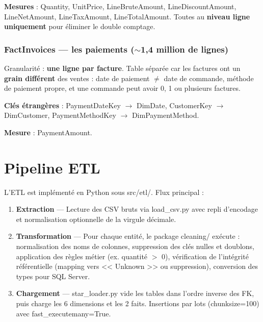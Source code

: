 \documentclass[11pt,a4paper]{article}
\renewcommand{\texttt}[1]{{\ttfamily\small\colorbox{codebg}{\textcolor{darktext}{#1}}}}
\begin{document}
\textbf{Mesures} : Quantity, UnitPrice, LineBruteAmount, LineDiscountAmount, LineNetAmount, LineTaxAmount, LineTotalAmount. Toutes au \textbf{niveau ligne uniquement} pour éliminer le double comptage.

\subsubsection{FactInvoices --- les paiements ($\sim$1,4 million de lignes)}

Granularité : \textbf{une ligne par facture}. Table séparée car les factures ont un \textbf{grain différent} des ventes : date de paiement $\neq$ date de commande, méthode de paiement propre, et une commande peut avoir 0, 1 ou plusieurs factures.

\textbf{Clés étrangères} : PaymentDateKey $\to$ DimDate, CustomerKey $\to$ DimCustomer, PaymentMethodKey $\to$ DimPaymentMethod.

\textbf{Mesure} : PaymentAmount.

\section{Pipeline ETL}

L'ETL est implémenté en Python sous \texttt{src/etl/}. Flux principal :

\begin{enumerate}[noitemsep,leftmargin=1.2em]
  \item \textbf{\color{accent}Extraction} --- Lecture des CSV bruts via \texttt{load\_csv.py} avec repli d'encodage et normalisation optionnelle de la virgule décimale.
  \item \textbf{\color{accent}Transformation} --- Pour chaque entité, le package \texttt{cleaning/} exécute : normalisation des noms de colonnes, suppression des clés nulles et doublons, application des règles métier (ex. quantité $>$ 0), vérification de l'intégrité référentielle (mapping vers << Unknown >> ou suppression), conversion des types pour SQL Server.
  \item \textbf{\color{accent}Chargement} --- \texttt{star\_loader.py} vide les tables dans l'ordre inverse des FK, puis charge les 6 dimensions et les 2 faits. Insertions par lots (\texttt{chunksize=100}) avec \texttt{fast\_executemany=True}.
\end{enumerate}
\end{document}
